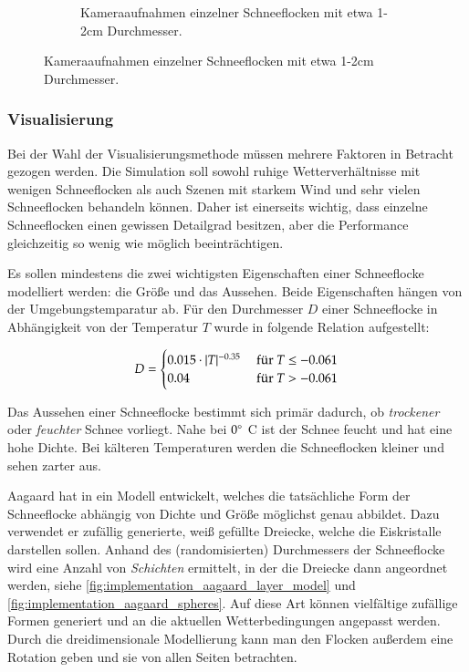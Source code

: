 \begin{figure}
\begin{subfigure}[b]{0.5\textwidth}
            \caption{Kameraaufnahmen einzelner Schneeflocken mit etwa 1-2cm Durchmesser\cite{Hanesch1966}.}
            \label{fig:implementation_real_snowflakes}
    \end{subfigure}
\end{figure}

\subsubsection{Visualisierung}

Bei der Wahl der Visualisierungsmethode müssen mehrere Faktoren in
Betracht gezogen werden. Die Simulation soll sowohl ruhige
Wetterverhältnisse mit wenigen Schneeflocken als auch Szenen mit
starkem Wind und sehr vielen Schneeflocken behandeln können. Daher ist
einerseits wichtig, dass einzelne Schneeflocken einen gewissen
Detailgrad besitzen, aber die Performance gleichzeitig so wenig wie
möglich beeinträchtigen.

Es sollen mindestens die zwei wichtigsten Eigenschaften einer
Schneeflocke modelliert werden: die Größe und das Aussehen. Beide
Eigenschaften hängen von der Umgebungstemparatur ab. Für den Durchmesser $D$
einer Schneeflocke in Abhängigkeit von der Temperatur $T$ wurde in
\cite{Jun00} folgende Relation aufgestellt:

\begin{equation}
D =
\begin{cases}
0.015 \cdot |T|^{-0.35} & \textnormal{ für }T \leq -0.061 \\
0.04 & \textnormal{ für }T > -0.061
\end{cases}
\end{equation}

Das Aussehen einer Schneeflocke bestimmt sich primär dadurch, ob
\emph{trockener} oder \emph{feuchter} Schnee vorliegt. Nahe bei
$0^{\circ}$ C ist der Schnee feucht und hat eine hohe
Dichte. Bei kälteren Temperaturen werden die Schneeflocken kleiner und
sehen zarter aus.

Aagaard hat in \cite{Aagaard2004} ein Modell entwickelt, welches die
tatsächliche Form der Schneeflocke abhängig von Dichte und Größe
möglichst genau abbildet. Dazu verwendet er zufällig generierte, weiß
gefüllte Dreiecke, welche die Eiskristalle darstellen sollen. Anhand
des (randomisierten) Durchmessers der Schneeflocke wird eine Anzahl
von \emph{Schichten} ermittelt, in der die Dreiecke dann angeordnet werden,
siehe \autoref{fig:implementation_aagaard_layer_model} und
\autoref{fig:implementation_aagaard_spheres}. Auf diese Art können
vielfältige zufällige Formen generiert und an die aktuellen
Wetterbedingungen angepasst werden. Durch die dreidimensionale
Modellierung kann man den Flocken außerdem eine Rotation geben und sie
von allen Seiten betrachten.

